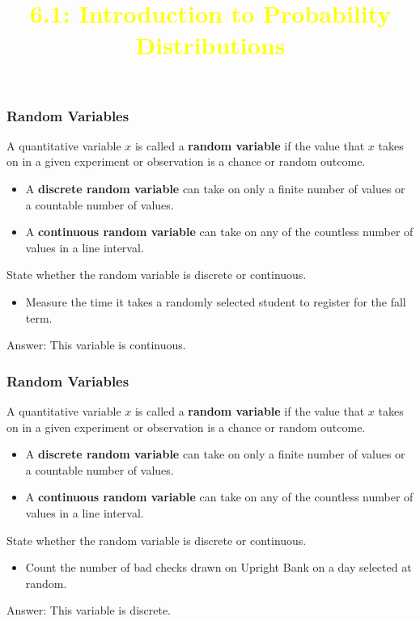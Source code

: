 \documentclass{beamer}
\title{\textcolor{yellow}{6.1: Introduction to Probability Distributions}} %
\date{}
\theoremstyle{definition}
\begin{document}
\frame{\titlepage}


\begin{frame}
\frametitle{Random Variables}\pause
\begin{definition}
A quantitative variable $x$ is called a \textbf{random variable} if the value that $x$ takes on in a given experiment or observation is a chance or random outcome.\pause
\begin{itemize}
\item A \textbf{discrete random variable} can take on only a finite number of values or a countable number of values.\pause
\item A \textbf{continuous random variable} can take on any of the countless number of values in a line interval.
\end{itemize}
\end{definition}\pause
\begin{example}
State whether the random variable is discrete or continuous.
\begin{itemize}
\item Measure the time it takes a randomly selected student to register for the fall term.
\end{itemize}\pause
\begin{flushright}Answer: This variable is continuous.\end{flushright}
\end{example}
\end{frame}

\begin{frame}
\frametitle{Random Variables}
\begin{definition}
A quantitative variable $x$ is called a \textbf{random variable} if the value that $x$ takes on in a given experiment or observation is a chance or random outcome.
\begin{itemize}
\item A \textbf{discrete random variable} can take on only a finite number of values or a countable number of values.
\item A \textbf{continuous random variable} can take on any of the countless number of values in a line interval.
\end{itemize}
\end{definition}
\begin{example}
State whether the random variable is discrete or continuous.
\begin{itemize}
\item Count the number of bad checks drawn on Upright Bank on a day selected at random.
\end{itemize}\pause
\begin{flushright}Answer: This variable is discrete.\end{flushright}
\end{example}
\end{frame}
\end{document}
